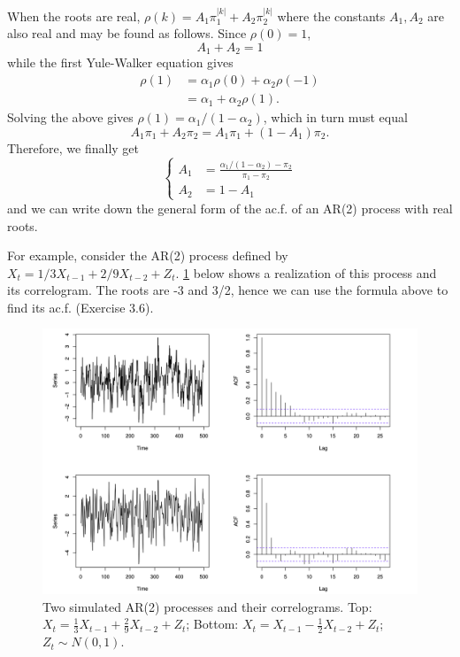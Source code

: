 When the roots are real, $\rho(k) = A_1 \pi_1^{|k|} + A_2 \pi_2^{|k|}$ where the constants $A_1, A_2$ are also 
real and may be found as follows. Since $\rho(0) = 1$, 
\[ A_1 + A_2 = 1 \]
while the first Yule-Walker equation gives 
\begin{align*}
	\rho(1) 
	&= \alpha_1 \rho(0) + \alpha_2 \rho(-1) \\
	&= \alpha_1 + \alpha_2 \rho(1).
\end{align*}
Solving the above gives $\rho(1) = \alpha_1 / (1 - \alpha_2)$, which in turn must equal 
\[ A_1 \pi_1 + A_2 \pi_2 = A_1 \pi_1 + (1 - A_1)\pi_2. \]
Therefore, we finally get 
\[ \begin{cases}
	A_1 &= \frac{\alpha_1 / (1 - \alpha_2) - \pi_2}{\pi_1 - \pi_2} \\
	A_2 &= 1 - A_1
\end{cases} \]
and we can write down the general form of the ac.f. of an AR(2) process with real roots.

For example, consider the AR(2) process defined by $X_t = 1/3X_{t-1} + 2/9X_{t-2} + Z_t$. \cref{fig:3.5} 
below shows a realization of this process and its correlogram. The roots are -3 and 3/2, hence we can use the 
formula above to find its ac.f. (Exercise 3.6).

\begin{figure}[h]
	\centering
	\includegraphics[width=\textwidth]{Chapter 3/fig3-5.png}
	\caption{Two simulated AR(2) processes and their correlograms. Top: $X_t = \frac{1}{3}X_{t-1} + \frac{2}{9} 
	X_{t-2} + Z_t$; Bottom: $X_t = X_{t-1} - \frac{1}{2}X_{t-2} + Z_t$; $Z_t \sim N(0, 1)$.}
	\label{fig:3.5}
\end{figure}

